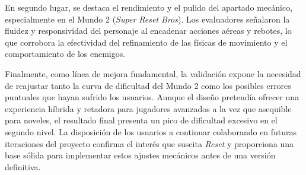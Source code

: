 En segundo lugar, se destaca el rendimiento y el pulido del apartado mecánico, especialmente en el Mundo 2 (\textit{Super Reset Bros}). Los evaluadores señalaron la fluidez y responsividad del personaje al encadenar acciones aéreas y rebotes, lo que corrobora la efectividad del refinamiento de las físicas de movimiento y el comportamiento de los enemigos.

Finalmente, como línea de mejora fundamental, la validación expone la necesidad de reajustar tanto la curva de dificultad del Mundo 2 como los posibles errores puntuales que hayan sufrido los usuarios. Aunque el diseño pretendía ofrecer una experiencia híbrida y retadora para jugadores avanzados a la vez que asequible para noveles, el resultado final presenta un pico de dificultad excesivo en el segundo nivel. La disposición de los usuarios a continuar colaborando en futuras iteraciones del proyecto confirma el interés que suscita \textit{Reset} y proporciona una base sólida para implementar estos ajustes mecánicos antes de una versión definitiva.